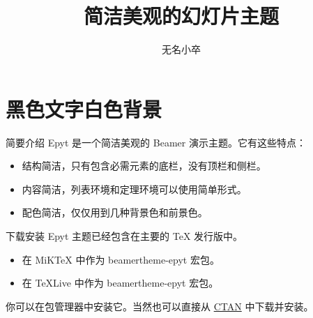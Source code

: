 \documentclass[14pt,notheorems]{beamer}
\newcommand{\mylead}[1]{\textcolor{acolor1}{#1}}
\newcommand{\mybold}[1]{\textcolor{acolor2}{#1}}
\begin{document}
\title{简洁美观的幻灯片主题}
\author{无名小卒}

\begin{frame}[plain]\transboxout
\titlepage
\end{frame}


\section{黑色文字白色背景}

\begin{frame}{简要介绍}
\mylead{Epyt} 是一个简洁美观的 Beamer 演示主题。它有这些特点：\pause
\begin{itemize}[<+->]
\item 结构简洁，只有包含必需元素的底栏，没有顶栏和侧栏。
\item 内容简洁，列表环境和定理环境可以使用简单形式。
\item 配色简洁，仅仅用到几种背景色和前景色。
\end{itemize}
\end{frame}

\begin{frame}{下载安装}
\mylead{Epyt} 主题已经包含在主要的 TeX 发行版中。
\begin{itemize}
  \item 在 MiKTeX 中作为 \mybold{beamertheme-epyt} 宏包。
  \item 在 TeXLive 中作为 \mybold{beamertheme-epyt} 宏包。
\end{itemize}
你可以在包管理器中安装它。当然也可以直接从
\href{https://www.ctan.org/pkg/beamertheme-epyt}{CTAN} 中下载并安装。
\end{frame}

\end{document}
